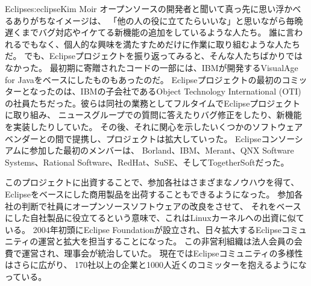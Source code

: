 \begin{aosachapter}{Eclipse}{s:eclipse}{Kim Moir}
オープンソースの開発者と聞いて真っ先に思い浮かべるありがちなイメージは、
「他の人の役に立てたらいいな」と思いながら毎晩遅くまでバグ対応やイケてる新機能の追加をしているような人たち。
誰に言われるでもなく、個人的な興味を満たすためだけに作業に取り組むような人たちだ。
でも、Eclipseプロジェクトを振り返ってみると、そんな人たちばかりではなかった。
最初期に寄贈されたコードの一部には、IBMが開発するVisualAge for Javaをベースにしたものもあったのだ。
Eclipseプロジェクトの最初のコミッターとなったのは、IBMの子会社であるObject Technology International (OTI)
の社員たちだった。彼らは同社の業務としてフルタイムでEclipseプロジェクトに取り組み、
ニュースグループでの質問に答えたりバグ修正をしたり、新機能を実装したりしていた。
その後、それに関心を示したいくつかのソフトウェアベンダーとの間で提携し、プロジェクトは拡大していった。
Eclipseコンソーシアムに参加した最初のメンバーは、
Borland、IBM、Merant、QNX Software Systems、Rational Software、RedHat、SuSE、そしてTogetherSoftだった。

このプロジェクトに出資することで、参加各社はさまざまなノウハウを得て、
Eclipseをベースにした商用製品を出荷することもできるようになった。
参加各社の判断で社員にオープンソースソフトウェアの改良をさせて、
それをベースにした自社製品に役立てるという意味で、これはLinuxカーネルへの出資に似ている。
2004年初頭にEclipse Foundationが設立され、日々拡大するEclipseコミュニティの運営と拡大を担当することになった。
この非営利組織は法人会員の会費で運営され、理事会が統治していた。
現在ではEclipseコミュニティの多様性はさらに広がり、
170社以上の企業と1000人近くのコミッターを抱えるようになっている。


\end{aosachapter}
